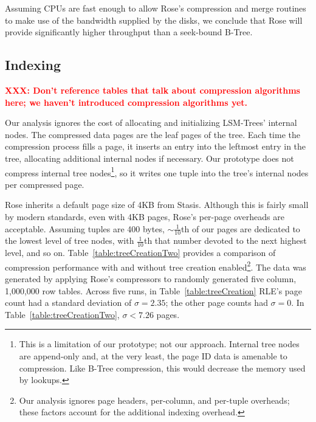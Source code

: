 \documentclass{vldb}
\newcommand{\rows}{Rose\xspace}
\newcommand{\rowss}{Rose's\xspace}
\newcommand{\xxx}[1]{\textcolor{red}{\bf XXX: #1}}
\begin{document}
Assuming CPUs are fast enough to allow \rowss
compression and merge routines to make use of the bandwidth supplied
by the disks, we conclude that \rows will provide significantly higher
throughput than a seek-bound B-Tree.

\subsection{Indexing}

\xxx{Don't reference tables that talk about compression algorithms here; we haven't introduced compression algorithms yet.}

Our analysis ignores the cost of allocating and initializing
LSM-Trees' internal nodes.  The compressed data pages are the leaf
pages of the tree.  Each time the compression process fills a page, it
inserts an entry into the leftmost entry in the tree, allocating
additional internal nodes if necessary.  Our prototype does not compress
internal tree nodes\footnote{This is a limitation of our prototype;
  not our approach.  Internal tree nodes are append-only and, at the
  very least, the page ID data is amenable to compression. Like B-Tree
  compression, this would decrease the memory used by lookups.},
so it writes one tuple into the tree's internal nodes per compressed
page.

\rows inherits a default page size of 4KB from Stasis.
Although this is fairly small by modern standards, even with
4KB pages, \rowss per-page overheads are acceptable.  Assuming tuples
are 400 bytes, $\sim\frac{1}{10}$th of our pages are dedicated to the
lowest level of tree nodes, with $\frac{1}{10}$th that number devoted
to the next highest level, and so on.
Table~\ref{table:treeCreationTwo} provides a comparison of compression
performance with and without tree creation enabled\footnote{Our
  analysis ignores page headers, per-column, and per-tuple overheads;
  these factors account for the additional indexing overhead.}.  The
data was generated by applying \rowss compressors to randomly
generated five column, 1,000,000 row tables.  Across five runs, in
Table~\ref{table:treeCreation} RLE's page count had a standard
deviation of $\sigma=2.35$; the other page counts had $\sigma=0$.  In
Table~\ref{table:treeCreationTwo}, $\sigma < 7.26$ pages.

\end{document}
